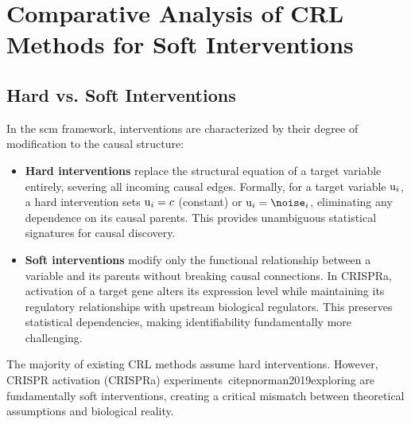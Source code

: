 
\section{Comparative Analysis of CRL Methods for Soft Interventions}
\label{app:crl_methods}

\subsection{Hard vs. Soft Interventions}
\label{app:crl_methods:intervention_types}

In the \gls{scm} framework, interventions are characterized by their degree of modification to the causal structure:

\begin{itemize}
    \item \textbf{Hard interventions} replace the structural equation of a target variable entirely, severing all incoming causal edges. Formally, for a target variable ${\textnormal{u}}_i$, a hard intervention sets ${\textnormal{u}}_i = c$ (constant) or $\latentcausalvar_i = \noise_i$, eliminating any dependence on its causal parents. This provides unambiguous statistical signatures for causal discovery.
    \item \textbf{Soft interventions} modify only the functional relationship between a variable and its parents without breaking causal connections. In CRISPRa, activation of a target gene alters its expression level while maintaining its regulatory relationships with upstream biological regulators. This preserves statistical dependencies, making identifiability fundamentally more challenging.
\end{itemize}

The majority of existing CRL methods assume hard interventions. However, CRISPR activation (CRISPRa) experiments~citep{norman2019exploring} are fundamentally soft interventions, creating a critical mismatch between theoretical assumptions and biological reality.



